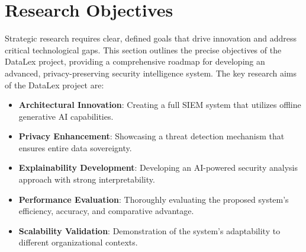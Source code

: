\section{Research Objectives}
\label{sec_research_objectives}

Strategic research requires clear, defined goals that drive innovation and address critical technological gaps. This section outlines the precise objectives of the DataLex project, providing a comprehensive roadmap for developing an advanced, privacy-preserving security intelligence system. The key research aims of the DataLex project are:

\begin{itemize}
    \item \textbf{Architectural Innovation}: Creating a full SIEM system that utilizes offline generative AI capabilities.
    \item \textbf{Privacy Enhancement}: Showcasing a threat detection mechanism that ensures entire data sovereignty.
    \item \textbf{Explainability Development}: Developing an AI-powered security analysis approach with strong interpretability.
    \item \textbf{Performance Evaluation}: Thoroughly evaluating the proposed system's efficiency, accuracy, and comparative advantage.
    \item \textbf{Scalability Validation}: Demonstration of the system's adaptability to different organizational contexts.
\end{itemize}
